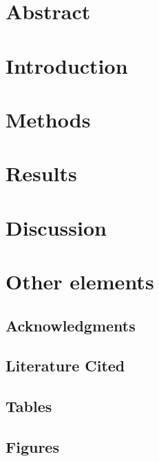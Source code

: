 \documentclass[
]{book}
\begin{document}
\hypertarget{abstract}{%
\section{Abstract}\label{abstract}}

\hypertarget{introduction-1}{%
\section{Introduction}\label{introduction-1}}

\hypertarget{methods}{%
\section{Methods}\label{methods}}

\hypertarget{results}{%
\section{Results}\label{results}}

\hypertarget{discussion}{%
\section{Discussion}\label{discussion}}

\hypertarget{other-elements}{%
\section{Other elements}\label{other-elements}}

\hypertarget{acknowledgments}{%
\subsection{Acknowledgments}\label{acknowledgments}}

\hypertarget{literature-cited}{%
\subsection{Literature Cited}\label{literature-cited}}

\hypertarget{tables-2}{%
\subsection{Tables}\label{tables-2}}

\hypertarget{figures-1}{%
\subsection{Figures}\label{figures-1}}
\end{document}

